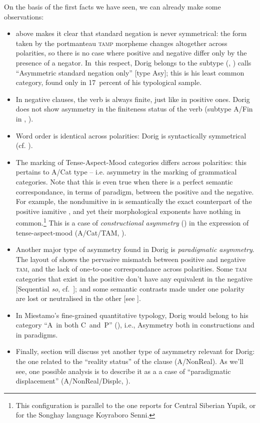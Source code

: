 \documentclass[output=paper,colorlinks,citecolor=brown,draft]{langscibook}
\begin{document}
On the basis of the first facts we have seen, we can already make some observations:

\begin{itemize}
    \item {} above makes it clear that standard negation is never symmetrical: the form taken by the portmanteau \textsc{tamp} morpheme changes altogether across polarities, so there is no case where positive and negative differ only by the presence of a negator. In~this respect, Dorig belongs to the subtype \citeauthor{Miestamo2005} (\citeyear[170]{Miestamo2005}, \citeyear{Miestamo2013-wals114}) calls “Asymmetric standard negation only” [type Asy]; this is his least common category, found only in 17~percent of his typological sample.
    \item In negative clauses, the verb is always finite, just like in positive ones. Dorig does not show asymmetry in the finiteness status of the verb (subtype A/Fin in \citealt[73]{Miestamo2005}, \citealt{Miestamo2013-wals114}).
    \item Word order is identical across polarities: Dorig is syntactically symmetrical (cf. \citealt[153]{Miestamo2005}).
    \item The marking of Tense-Aspect-Mood categories differs across polarities: this pertains to  A/Cat type – i.e. asymmetry in the marking of grammatical categories. Note that this is even true when there is a perfect semantic correspondance, in terms of paradigm, between the positive and the negative. For example, the nondumitive in  is semantically the exact counterpart of the positive iamitive , and yet their morphological exponents have nothing in common.\footnote{This configuration is parallel to the one \citet[117]{Miestamo2005} reports for Central Siberian Yupik, or for the Songhay language Koyraboro Senni.} This is a case of \textit{constructional asymmetry} (\citeyear[52]{Miestamo2005}) in the expression of tense-aspect-mood (A/Cat/TAM, \citeyear[116]{Miestamo2005}).
    \item Another major type of asymmetry found in Dorig is \textit{paradigmatic asymmetry}. The layout of  shows the pervasive mismatch between positive and negative \textsc{tam}, and the lack of one-to-one correspondance across polarities. Some \textsc{tam} categories that exist in the positive don’t have any equivalent in the negative [Sequential \textit{so}, cf.~]; and some semantic contrasts made under one polarity are lost or neutralised in the other [see ].
    \item In Miestamo’s fine-grained quantitative typology, Dorig would belong to his category “A~in both C~and~P” (\citeyear[172]{Miestamo2005}), i.e., Asymmetry both in constructions and in paradigms.
    \item Finally, section  will discuss yet another type of asymmetry relevant for Dorig: the one related to the “reality status” of the clause (A/NonReal). As we'll see, one possible analysis is to describe it as a a case of “paradigmatic displacement” (A/NonReal/Displc, \citeyear[98]{Miestamo2005}).
\end{itemize}
\end{document}
